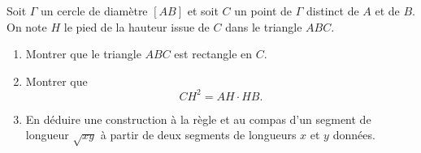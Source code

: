 Soit $\Gamma$ un cercle de diamètre $[AB]$ et soit $C$ un point de
$\Gamma$ distinct de $A$ et de $B$. On note $H$ le pied de la hauteur
issue de $C$ dans le triangle $ABC$.

\begin{enumerate}
  \item Montrer que le triangle $ABC$ est rectangle en $C$.
  \item Montrer que
  \[
  CH^2 = AH \cdot HB.
  \]
  \item En déduire une construction à la règle et au compas d'un
  segment de longueur $\sqrt{xy}$ à partir de deux segments de
  longueurs $x$ et $y$ données.
\end{enumerate}
